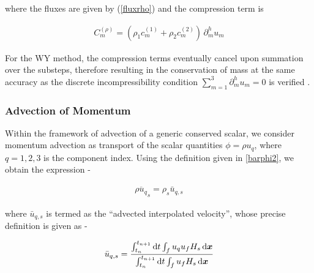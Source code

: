 where the fluxes are given by (\ref{fluxrho}) and the compression term is



\begin{align}
C_m^{(\rho)} =  \left( \rho_1 c^{(1)}_m + \rho_2 c^{(2)}_m \right) \,\partial_{m}^h u_m  
\label{central}
\end{align}



For the WY method, the compression terms eventually cancel upon 
summation over the substeps, therefore resulting in the conservation  
of mass at the same accuracy as the discrete incompressibility condition
$\sum_{m=1}^3 \partial_{m}^h u_m=0$ is verified 
. 



\subsubsection*{Advection of Momentum}

Within the framework of advection of a generic conserved scalar,
we consider momentum advection as transport of the scalar quantities  
$\phi=\rho u_q$, where $q=1,2,3$ is the component index. 
Using the definition given in \eqref{barphi2}, 
we obtain the expression -  



\begin{align} 
\overline{\rho u_q}_s = \rho_s \bar u_{q,s} 
\end{align}


where $\bar u_{q,s}$ is termed as the ``advected interpolated velocity'', 
whose precise definition is given as - 


\begin{align}
	\bar u_{q,s} =  \frac{\int_{t_n}^{t_{n+1}} {\textrm{d}}t \int_{f}  u_q u_f  H_s  \, {\textrm{d}}\boldsymbol{x}}{\int_{t_n}^{t_{n+1}} {\textrm{d}}t \int_{f}  u_f  H_s\,{\textrm{d}}\boldsymbol{x}} \label{barudef}
\end{align}



